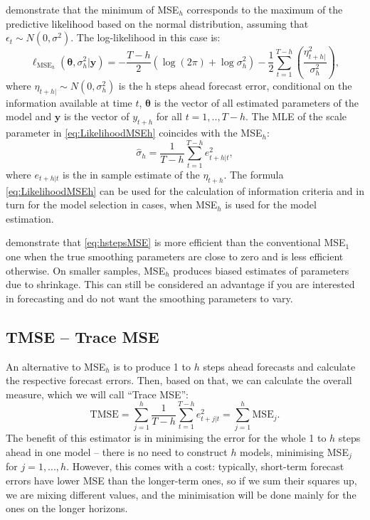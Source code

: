 \documentclass[
]{book}
\theoremstyle{definition}
\theoremstyle{definition}
\theoremstyle{definition}
\theoremstyle{definition}
\theoremstyle{remark}
\begin{document}
\citet{Svetunkov2020Multistep} demonstrate that the minimum of MSE\(_h\) corresponds to the maximum of the predictive likelihood based on the normal distribution, assuming that \(\epsilon_t \sim N(0,\sigma^2)\). The log-likelihood in this case is:
\begin{equation}
    \ell_{\mathrm{MSE}_h}(\boldsymbol{\theta}, {\sigma^2_h} | \mathbf{y}) = -\frac{T-h}{2} \left( \log(2 \pi) + \log \sigma^2_h \right) -\frac{1}{2} \sum_{t=1}^{T-h} \left( \frac{\eta_{t+h|}^2}{\sigma^2_h} \right) ,
  \label{eq:LikelihoodMSEh}
\end{equation}
where \(\eta_{t+h|} \sim N(0, \sigma_h^2)\) is the h steps ahead forecast error, conditional on the information available at time \(t\), \(\boldsymbol{\theta}\) is the vector of all estimated parameters of the model and \(\mathbf{y}\) is the vector of \(y_{t+h}\) for all \(t=1,..,T-h\). The MLE of the scale parameter in \eqref{eq:LikelihoodMSEh} coincides with the MSE\(_h\):
\begin{equation}
    \hat{\sigma}_h = \frac{1}{T-h} \sum_{t=1}^{T-h} e_{t+h|t}^2 ,
  \label{eq:hstepsSigma}
\end{equation}
where \(e_{t+h|t}\) is the in sample estimate of the \(\eta_{t+h}\). The formula \eqref{eq:LikelihoodMSEh} can be used for the calculation of information criteria and in turn for the model selection in cases, when MSE\(_h\) is used for the model estimation.

\citet{Svetunkov2020Multistep} demonstrate that \eqref{eq:hstepsMSE} is more efficient \citep[see Section 4.3 of][]{SvetunkovSBA} than the conventional MSE\(_1\) one when the true smoothing parameters are close to zero and is less efficient otherwise. On smaller samples, MSE\(_h\) produces biased estimates of parameters due to shrinkage. This can still be considered an advantage if you are interested in forecasting and do not want the smoothing parameters to vary.

\hypertarget{multistepLossesTMSE}{%
\subsection{TMSE -- Trace MSE}\label{multistepLossesTMSE}}

An alternative to MSE\(_h\) is to produce 1 to \(h\) steps ahead forecasts and calculate the respective forecast errors. Then, based on that, we can calculate the overall measure, which we will call ``Trace MSE'':
\begin{equation}
    \mathrm{TMSE} = \sum_{j=1}^h \frac{1}{T-h} \sum_{t=1}^{T-h} e_{t+j|t}^2 = \sum_{j=1}^h \mathrm{MSE}_j.
  \label{eq:TMSE}
\end{equation}
The benefit of this estimator is in minimising the error for the whole 1 to \(h\) steps ahead in one model -- there is no need to construct \(h\) models, minimising MSE\(_j\) for \(j=1,...,h\). However, this comes with a cost: typically, short-term forecast errors have lower MSE than the longer-term ones, so if we sum their squares up, we are mixing different values, and the minimisation will be done mainly for the ones on the longer horizons.
\end{document}
